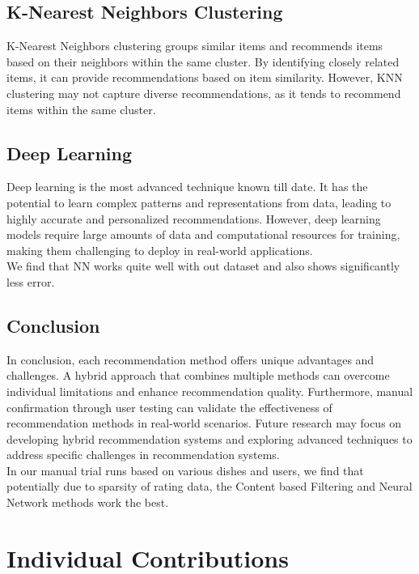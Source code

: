 \documentclass[conference]{IEEEtran}
\begin{document}
\subsection{K-Nearest Neighbors Clustering}

K-Nearest Neighbors clustering groups similar items and recommends items based on their neighbors within the same cluster. By identifying closely related items, it can provide recommendations based on item similarity. However, KNN clustering may not capture diverse recommendations, as it tends to recommend items within the same cluster.

\subsection{Deep Learning}

Deep learning is the most advanced technique known till date. It has the potential to learn complex patterns and representations from data, leading to highly accurate and personalized recommendations. However, deep learning models require large amounts of data and computational resources for training, making them challenging to deploy in real-world applications.\\
We find that NN works quite well with out dataset and also shows significantly less error.

\subsection{Conclusion}

In conclusion, each recommendation method offers unique advantages and challenges. A hybrid approach that combines multiple methods can overcome individual limitations and enhance recommendation quality. Furthermore, manual confirmation through user testing can validate the effectiveness of recommendation methods in real-world scenarios. Future research may focus on developing hybrid recommendation systems and exploring advanced techniques to address specific challenges in recommendation systems.\\
In our manual trial runs based on various dishes and users, we find that potentially due to sparsity of rating data, the Content based Filtering and Neural Network methods work the best.

\section{Individual Contributions}
\end{document}
